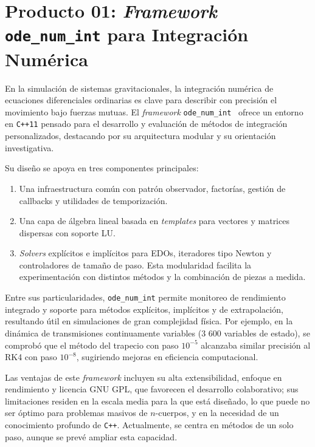 \section[\textit{Framework} \texttt{ode\_num\_int}]{Producto 01: \textit{Framework} \texttt{ode\_num\_int} para Integración Numérica}%
\label{sec:state_of_the_art_01}

En la simulación de sistemas gravitacionales, la integración numérica de ecuaciones diferenciales ordinarias es clave para describir con precisión el movimiento bajo fuerzas mutuas. El \textit{framework} \texttt{ode\_num\_int}~\cite{Orlov2017} ofrece un entorno en \texttt{C++11} pensado para el desarrollo y evaluación de métodos de integración personalizados, destacando por su arquitectura modular y su orientación investigativa.

Su diseño se apoya en tres componentes principales:
\begin{enumerate}
    \item Una infraestructura común con patrón observador, factorías, gestión de callbacks y utilidades de temporización.
    \item Una capa de álgebra lineal basada en \textit{templates} para vectores y matrices dispersas con soporte LU.\
    \item \textit{Solvers} explícitos e implícitos para EDOs, iteradores tipo Newton y controladores de tamaño de paso. Esta modularidad facilita la experimentación con distintos métodos y la combinación de piezas a medida.
\end{enumerate}

Entre sus particularidades, \texttt{ode\_num\_int} permite monitoreo de rendimiento integrado y soporte para métodos explícitos, implícitos y de extrapolación, resultando útil en simulaciones de gran complejidad física. Por ejemplo, en la dinámica de transmisiones continuamente variables (3 600 variables de estado), se comprobó que el método del trapecio con paso \(10^{-5}\) alcanzaba similar precisión al RK4 con paso \(10^{-8}\), sugiriendo mejoras en eficiencia computacional.

Las ventajas de este \textit{framework} incluyen su alta extensibilidad, enfoque en rendimiento y licencia GNU GPL, que favorecen el desarrollo colaborativo; sus limitaciones residen en la escala media para la que está diseñado, lo que puede no ser óptimo para problemas masivos de \(n\)-cuerpos, y en la necesidad de un conocimiento profundo de \texttt{C++}. Actualmente, se centra en métodos de un solo paso, aunque se prevé ampliar esta capacidad.

